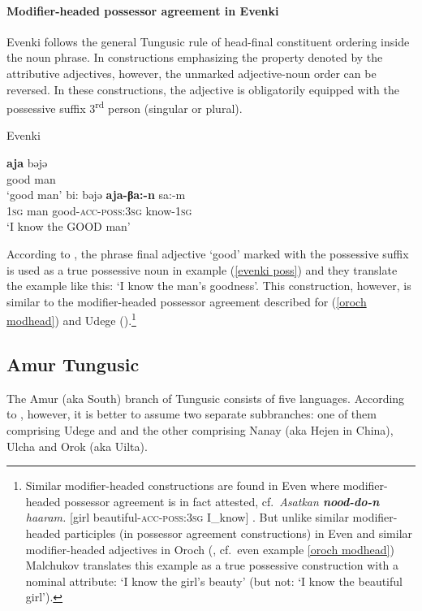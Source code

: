 \paragraph{Modifier-headed possessor agreement in Evenki}
Evenki follows the general Tungusic rule of head-final constituent ordering inside the noun phrase. In constructions emphasizing the property denoted by the attributive adjectives, however, the unmarked adjective-noun order can be reversed. In these constructions, the adjective is obligatorily equipped with the possessive suffix 3\textsuperscript{rd} person (singular or plural).
\begin{exe}
\ex 
\rm{Evenki \citep[18]{bulatova-etal1999}}
\begin{xlist}
\ex	
\gll	\textbf{aja} bəjə\\
	good man\\
\glt	‘good man’
\ex	\label{evenki poss}
\gll	bi: bəjə \textbf{aja-βa:-n} sa:-m\\
	\textsc{1sg} man good-\textsc{acc}-\textsc{poss:3sg} know-\textsc{1sg}\\
\glt	‘I know the GOOD man’
\end{xlist}
\end{exe}
According to \citet[18]{bulatova-etal1999}, the phrase final adjective ‘good’ marked with the possessive suffix is used as a true possessive noun in example (\ref{evenki poss}) and they translate the example like this: ‘I know the man's goodness’. This construction, however, is similar to the modifier-headed possessor agreement described for  (\ref{oroch modhead}) and Udege (\citealt[485, elsewhere]{nikolaeva-etal2001}).\footnote{Similar modifier-headed constructions are found in Even where modifier-headed possessor agreement is in fact attested, cf.~\textit{Asatkan \textbf{nood-do-n} haaram.} [girl beautiful-\textsc{acc}-\textsc{poss:3sg} I\_know] \citep[11]{malchukov1995}. But unlike similar modifier-headed participles (in possessor agreement constructions) in Even \citep[31]{malchukov1995} and similar modifier-headed adjectives in Oroch (\citealt{malchukov2000}, cf.~even example \ref{oroch modhead}) Malchukov translates this example as a true possessive construction with a nominal attribute: ‘I know the girl's beauty’ (but not: ‘I know the beautiful girl’).}

\subsection{Amur Tungusic}
The Amur (aka South) branch of Tungusic consists of five languages. According to \citet[223]{salminen2007}, however, it is better to assume two separate subbranches: one of them comprising Udege and  and the other comprising Nanay (aka Hejen in China), Ulcha and Orok (aka Uilta).

